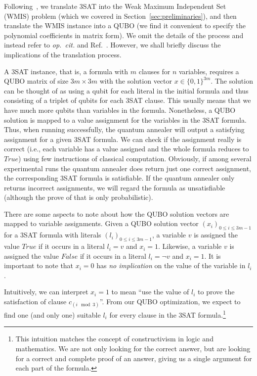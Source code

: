Following~\cite{choi2010adiabatic,choi2011different}, we translate 3SAT into the Weak Maximum Independent Set (WMIS) problem (which we covered in Section~\ref{sec:preliminaries}), and then translate the WMIS instance into a QUBO (we find it convenient to specify the polynomial coefficients in matrix form). We omit the details of the process and instead refer to \emph{op.~cit.{}} and Ref.~\cite{lucas2014ising}. However, we shall briefly discuss the implications of the translation process.

A 3SAT instance, that is, a formula with $m$ clauses for $n$ variables,
requires a QUBO matrix of size $3m \times 3m$ with the solution vector $x \in \{0,1\}^{3m}$. The solution can be thought of as using a qubit for each literal in the initial formula and thus consisting of a triplet of qubits for each 3SAT clause. This usually means that we have much more qubits than variables in the formula. Nonetheless, a QUBO solution is mapped to a value assignment for the variables in the 3SAT formula. Thus, when running successfully, the quantum annealer will output a satisfying assignment for a given 3SAT formula. We can check if the assignment really is correct (i.e., each variable has a value assigned and the whole formula reduces to $\textit{True}$) using few instructions of classical computation. Obviously, if among several experimental runs the quantum annealer does return just one correct assignment, the corresponding 3SAT formula is satisfiable. If the quantum annealer only returns incorrect assignments, we will regard the formula as unsatisfiable (although the prove of that is only probabilistic).

There are some aspects to note about how the QUBO solution vectors are mapped to variable assignments. Given a QUBO solution vector $(x_i)_{0 \leq i \leq 3m-1}$ for a 3SAT formula with literals $(l_i)_{0 \leq i \leq 3m-1}$, a variable $v$ is assigned the value $\textit{True}$ if it occurs in a literal $l_i = v$ and $x_i = 1$. Likewise, a variable $v$ is assigned the value $\textit{False}$ if it occurs in a literal $l_i = \lnot v$ and $x_i = 1$. It is important to note that $x_i = 0$ has \emph{no implication} on the value of the variable in $l_i$.

Intuitively, we can interpret $x_i = 1$ to mean ``use the value of $l_i$ to prove the satisfaction of clause $c_{(i \mod 3)}$''. From our QUBO optimization, we expect to find one (and only one) suitable $l_i$ for every clause in the 3SAT formula.\footnote{This intuition matches the concept of constructivism in logic and mathematics. We are not only looking for the correct answer, but are looking for a correct and complete proof of an answer, giving us a single argument for each part of the formula.}

